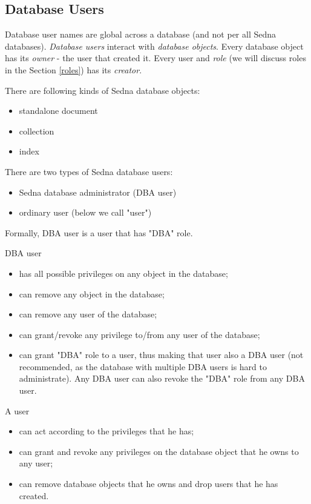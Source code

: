 \documentclass[a4paper,12pt]{article}
\begin{document}
\subsection{Database Users}

Database user names are global across a database (and not per all Sedna databases). \emph{Database users} interact with \emph{database objects}. Every database object has its \emph{owner} - the user that created it. Every user and \emph{role} (we will discuss roles in the Section \ref{roles}) has its \emph{creator}.

There are following kinds of Sedna database objects:
\begin{itemize}
\item standalone document
\item collection
\item index
\end{itemize}

There are two types of Sedna database users:

\begin{itemize}
\item Sedna database administrator (DBA user)
\item ordinary user (below we call "user")
\end{itemize}

Formally, DBA user is a user that has "DBA" role.

DBA user
\begin{itemize}
\item has all possible privileges on any object in the database;
\item can remove any object in the database;
\item can remove any user of the database;
\item can grant/revoke any privilege to/from any user of the database;
\item can grant "DBA" role to a user, thus making that user also a DBA user (not recommended, as the database with multiple DBA users is hard to administrate). Any DBA user can also revoke the "DBA" role from any DBA user.
\end{itemize}

A user
\begin{itemize}
\item can act according to the privileges that he has;
\item can grant and revoke any privileges on the database object that he owns to any user;
\item can remove database objects that he owns and drop users that he has created. 
\end{itemize}
\end{document}
